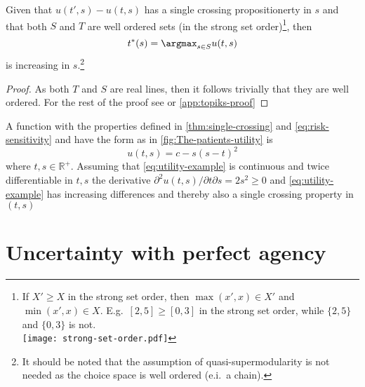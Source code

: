 \begin{proposition}
Given that $u(t',s)-u(t,s)$ has a single crossing propositionerty in $s$ and that both $S$ and $T$ are well ordered sets (in the strong set order)\footnote{If $X' \geq X$ in the strong set order, then $\max (x',x)\in X'$ and $\min (x',x)\in X$. E.g.\ $[2,5]\geq[0,3]$ in the strong set order, while $\{2,5\} $ and $\{0,3\}$ is not. \\
	\texttt{[image: strong-set-order.pdf]}
}, then
\[
	t^{*}(s)=\argmax_{s\in S}u(t,s)\label{eq:increasing-solution}
\]
is increasing in $s$.\footnote{It should be noted that the assumption of quasi-supermodularity is not needed as the choice space is well ordered (e.i.\ a chain).}
\end{proposition}

\begin{proof}
As both $T$ and $S$ are real lines, then it follows trivially that they are well ordered. For the rest of the proof see \textcite{Milgrom1994Monotone} or \cref{app:topiks-proof}
\end{proof}

\begin{example}
A function with the properties defined in \cref{thm:single-crossing} and \cref{eq:risk-sensitivity} and have the form as in \cref{fig:The-patients-utility} is
\[
	u(t,s) = c-s{(s-t)}^{2}\label{eq:utility-example}
\]
where $t,s\in\mathbb{R}^{+}$. Assuming that \cref{eq:utility-example} is continuous and twice differentiable in $t,s$  the derivative $\partial^{2}u(t,s)\big/\partial t\partial s=2s^{2}\ge0$ and \cref{eq:utility-example} has increasing differences and thereby also a single crossing property in $(t,s)$
\end{example}

\section{Uncertainty with perfect agency}

